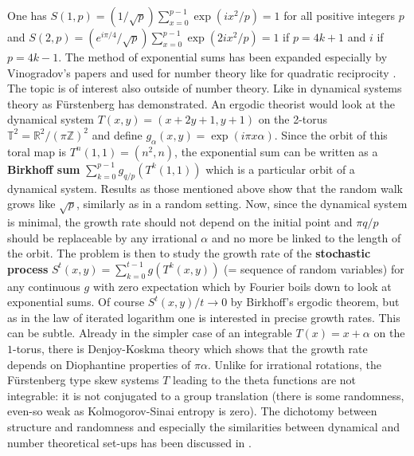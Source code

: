 \documentclass[12pt]{amsart}
\begin{document}
One has $S(1,p) = (1/\sqrt{p}) \sum_{x=0}^{p-1} \exp(i x^2/p) = 1$ for all positive integers $p$
and $S(2,p) = (e^{i \pi/4}/\sqrt{p}) \sum_{x=0}^{p-1} \exp(2 i x^2/p) = 1$ if $p=4k+1$
and $i$ if $p=4k-1$. The method of exponential sums has been 
expanded especially by Vinogradov's papers  \cite{Vinogradov} and used for 
number theory like for quadratic reciprocity \cite{MurtyPacelli}.
The topic is of interest also outside of number theory. Like in dynamical systems
theory as F\"urstenberg has demonstrated. An ergodic theorist would look 
at the dynamical system $T(x,y) = (x+2y+1,y+1)$ on the 2-torus
$\mathbb{T}^2=\mathbb{R}^2/(\pi \mathbb{Z})^2$ and define $g_{\alpha} (x,y)=\exp(i \pi x \alpha)$.
Since the orbit of this toral map is $T^n(1,1) = (n^2,n)$, the exponential sum 
can be written as a {\bf Birkhoff sum} $\sum_{k=0}^{p-1} g_{q/p}(T^k(1,1))$ which 
is a particular orbit of a dynamical system. Results
as those mentioned above show that the random walk grows like $\sqrt{p}$, similarly as in a 
random setting. Now, since the dynamical system is minimal, the growth rate should not
depend on the initial point and $\pi q/p$ should be replaceable by any irrational $\alpha$
and no more be linked to the length of the orbit. The problem is then to study 
the growth rate of the {\bf stochastic process} $S^t(x,y) = \sum_{k=0}^{t-1} g(T^k(x,y))$ 
(= sequence of random variables) for any 
continuous $g$ with zero expectation which by Fourier boils down to look at exponential sums. 
Of course $S^t(x,y)/t \to 0$ by Birkhoff's ergodic theorem, but as in the law of iterated logarithm
one is interested in precise growth rates. This can be subtle. 
Already in the simpler case of an integrable $T(x)=x+\alpha$ on the 
$1$-torus, there is Denjoy-Koskma theory which shows that the growth rate depends
on Diophantine properties of $\pi \alpha$. Unlike for irrational rotations, the F\"urstenberg type 
skew systems $T$ leading to the theta functions are not integrable: it is not conjugated to a group
translation (there is some randomness, even-so weak as Kolmogorov-Sinai entropy is zero).
The dichotomy between structure and randomness and especially
the similarities between dynamical and number theoretical set-ups has been discussed in
\cite{TaoStructureRandomness}. 

\begin{comment}
S[q_, p_] := p^(-1/2) Sum[Exp[Pi I k^2 q/p], {k, 0, p-1}];
F[q_, p_] := (S[2 q, p]/S[-p, 2 q]) Exp[-I Pi/4];
TheoremCheck=Chop[N[F[2 Random[Integer, 1000] + 3, 2 Random[Integer, 1000] + 3]]]
FormulaCheckA = Module[{},p=Random[Integer,100]+2; Chop[S[p,1]]]
FormulaCheckB = Module[{},p=2Random[Integer,100]+3; Chop[{Mod[p,4],N[Exp[I Pi/4] S[p,2]]}]]
\end{comment}
\end{document}

